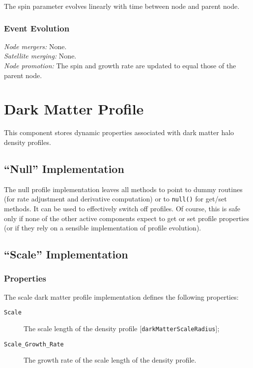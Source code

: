 The spin parameter evolves linearly with time between \gls{node} and parent node.

\subsubsection{Event Evolution}

\noindent\emph{Node mergers:} None.\\

\noindent\emph{Satellite merging:} None.\\

\noindent\emph{Node promotion:} The spin and growth rate are updated to equal those of the parent node.\\

\section{Dark Matter Profile}\label{sec:DarkMatterProfileComponent}

This \gls{component} stores dynamic properties associated with dark matter halo density profiles.

\subsection{``Null'' Implementation}

The null profile implementation leaves all methods to point to dummy routines (for rate adjustment and derivative computation) or to {\tt null()} for get/set methods. It can be used to effectively switch off profiles. Of course, this is safe only if none of the other active components expect to get or set profile properties (or if they rely on a sensible implementation of profile evolution).

\subsection{``Scale'' Implementation}

\subsubsection{Properties}

The scale dark matter profile implementation defines the following properties:
\begin{description}
 \item [{\tt Scale}] The scale length of the density profile [{\tt darkMatterScaleRadius}];
 \item [{\tt Scale\_Growth\_Rate}] The growth rate of the scale length of the density profile.
\end{description}

